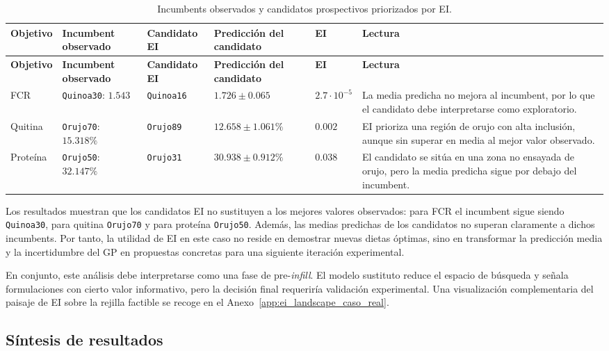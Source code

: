 \protect{}\label{tab:incumbents_candidatos_ei}
\begin{longtable}[]{@{}llllll@{}}
\caption{Incumbents observados y candidatos prospectivos priorizados por EI.}\tabularnewline
\toprule\noalign{}
\textbf{Objetivo} & \textbf{Incumbent observado} & \textbf{Candidato EI} & \textbf{Predicción del candidato} & \textbf{EI} & \textbf{Lectura} \\
\midrule\noalign{}
\endfirsthead
\toprule\noalign{}
\textbf{Objetivo} & \textbf{Incumbent observado} & \textbf{Candidato EI} & \textbf{Predicción del candidato} & \textbf{EI} & \textbf{Lectura} \\
\midrule\noalign{}
\endhead
\bottomrule\noalign{}
\endlastfoot
FCR & \texttt{Quinoa30}: \(1.543\) & \texttt{Quinoa16} & \(1.726 \pm 0.065\) & \(2.7{\cdot}10^{-5}\) & La media predicha no mejora al incumbent, por lo que el candidato debe interpretarse como exploratorio. \\
Quitina & \texttt{Orujo70}: \(15.318\%\) & \texttt{Orujo89} & \(12.658 \pm 1.061\%\) & \(0.002\) & EI prioriza una región de orujo con alta inclusión, aunque sin superar en media al mejor valor observado. \\
Proteína & \texttt{Orujo50}: \(32.147\%\) & \texttt{Orujo31} & \(30.938 \pm 0.912\%\) & \(0.038\) & El candidato se sitúa en una zona no ensayada de orujo, pero la media predicha sigue por debajo del incumbent. \\
\end{longtable}

Los resultados muestran que los candidatos EI no sustituyen a los mejores valores observados: para FCR el incumbent sigue siendo \texttt{Quinoa30}, para quitina \texttt{Orujo70} y para proteína \texttt{Orujo50}. Además, las medias predichas de los candidatos no superan claramente a dichos incumbents. Por tanto, la utilidad de EI en este caso no reside en demostrar nuevas dietas óptimas, sino en transformar la predicción media y la incertidumbre del GP en propuestas concretas para una siguiente iteración experimental.

En conjunto, este análisis debe interpretarse como una fase de pre-\emph{infill}. El modelo sustituto reduce el espacio de búsqueda y señala formulaciones con cierto valor informativo, pero la decisión final requeriría validación experimental. Una visualización complementaria del paisaje de EI sobre la rejilla factible se recoge en el Anexo~\ref{app:ei_landscape_caso_real}.

\subsection{Síntesis de resultados}\label{suxedntesis-de-resultados}

